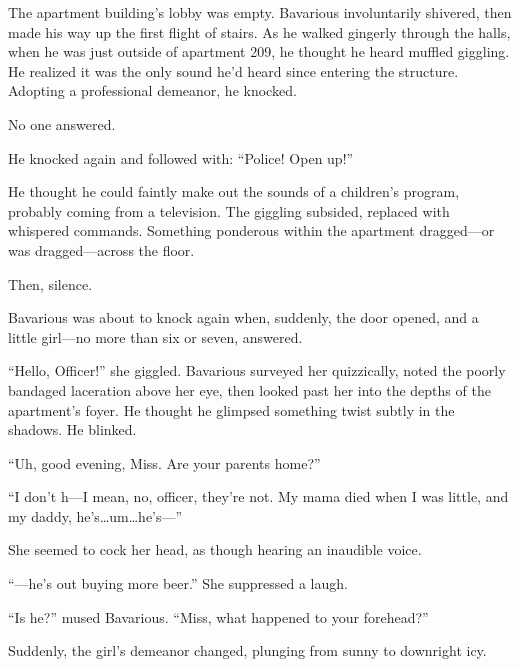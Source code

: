 The apartment building's lobby was empty. Bavarious involuntarily
shivered, then made his way up the first flight of stairs. As he
walked gingerly through the halls, when he was just outside of
apartment 209, he thought he heard muffled giggling. He realized it
was the only sound he'd heard since entering the structure.
Adopting a professional demeanor, he knocked.



No one answered.



He knocked again and followed with: ``Police! Open up!''



He thought he could faintly make out the sounds of a children's
program, probably coming from a television. The giggling subsided,
replaced with whispered commands. Something ponderous within the
apartment dragged---or was dragged---across the
floor.



Then, silence.



Bavarious was about to knock again when, suddenly, the door opened,
and a little girl---no more than six or seven, answered.



``Hello, Officer!'' she giggled. Bavarious surveyed her quizzically,
noted the poorly bandaged laceration above her eye, then looked
past her into the depths of the apartment's foyer. He thought he
glimpsed something twist subtly in the shadows. He blinked.



``Uh, good evening, Miss. Are your parents home?''



``I don't h---I mean, no, officer, they're not. My mama died
when I was little, and my daddy, he's{\ldots}um{\ldots}he's---''



She seemed to cock her head, as though hearing an inaudible
voice.



``---he's out buying more beer.'' She suppressed a laugh.



``Is he?'' mused Bavarious. ``Miss, what happened to your
forehead?''



Suddenly, the girl's demeanor changed, plunging from sunny to
downright icy.




